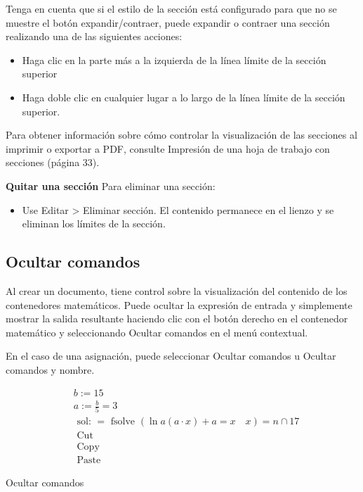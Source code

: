 Tenga en cuenta que si el estilo de la sección está configurado para que no se muestre el botón expandir/contraer, puede expandir o contraer una sección realizando una de las siguientes acciones:
\begin{itemize}
  \item Haga clic en la parte más a la izquierda de la línea límite de la sección superior

\item Haga doble clic en cualquier lugar a lo largo de la línea límite de la sección superior.
\end{itemize}

Para obtener información sobre cómo controlar la visualización de las secciones al imprimir o exportar a PDF, consulte Impresión de una hoja de trabajo con secciones (página 33).

\textbf{Quitar una sección}
Para eliminar una sección:

\begin{itemize}
  \item Use Editar > Eliminar sección. El contenido permanece en el lienzo y se eliminan los límites de la sección.
\end{itemize}

\subsection{Ocultar comandos}
Al crear un documento, tiene control sobre la visualización del contenido de los contenedores matemáticos. Puede ocultar la expresión de entrada y simplemente mostrar la salida resultante haciendo clic con el botón derecho en el contenedor matemático y seleccionando Ocultar comandos en el menú contextual.

En el caso de una asignación, puede seleccionar Ocultar comandos u Ocultar comandos y nombre.

\begin{equation*}
\begin{aligned}
& b:=15 \\
& a:=\frac{b}{5}=3 \\
& \text { sol: }=\text { fsolve }(\ln a(a \cdot x)+a=x \quad x)=n \cap 17 \\
& \text { Cut } \\
& \text { Copy } \\
& \text { Paste }
\end{aligned}
\end{equation*}

Ocultar comandos

